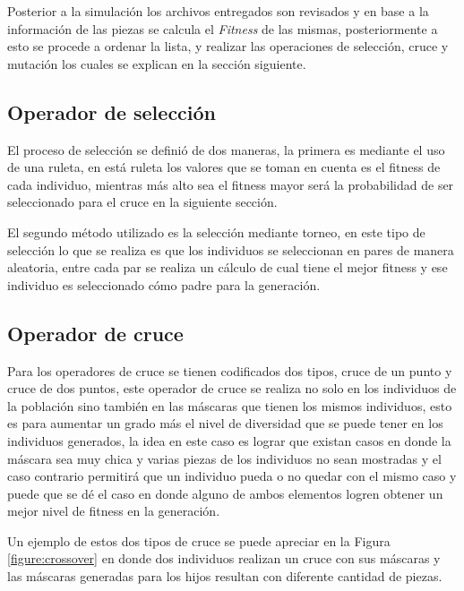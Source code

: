 Posterior a la simulación los archivos entregados son revisados y en base a la
información de las piezas se calcula el \textit{Fitness} de las mismas,
posteriormente a esto se procede a ordenar la lista, y realizar las operaciones
de selección, cruce y mutación los cuales se explican en la sección siguiente.

\subsection{Operador de selección}
\label{subsection:sel_operator}

El proceso de selección se definió de dos maneras, la primera es
mediante el uso de una ruleta, en está ruleta los valores que
se toman en cuenta es el fitness de cada individuo, mientras más alto sea el
fitness mayor será la probabilidad de ser seleccionado para el cruce en la
siguiente sección.

El segundo método utilizado es la selección mediante torneo, en este tipo de
selección lo que se realiza es que los individuos se seleccionan en pares de
manera aleatoria, entre cada par se realiza un cálculo de cual tiene el mejor
fitness y ese individuo es seleccionado cómo padre para la generación.

\subsection{Operador de cruce}
\label{subsection:crossover_operator}

Para los operadores de cruce se tienen codificados dos tipos, cruce de un punto
y cruce de dos puntos, este operador de cruce se realiza no solo en los
individuos de la población sino también en las máscaras que tienen los mismos
individuos, esto es para aumentar un grado más el nivel de diversidad que se
puede tener en los individuos generados, la idea en este caso es lograr que
existan casos en donde la máscara sea muy chica y varias piezas de los
individuos no sean mostradas y el caso contrario permitirá que un individuo
pueda o no quedar con el mismo caso y puede que se dé el caso en donde alguno de
ambos elementos logren obtener un mejor nivel de fitness en la generación.

Un ejemplo de estos dos tipos de cruce se puede apreciar en la Figura
\ref{figure:crossover} en donde dos individuos realizan un cruce con sus
máscaras y las máscaras generadas para los hijos resultan con diferente cantidad
de piezas.

